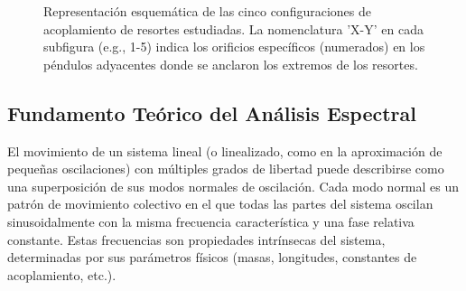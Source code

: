 \begin{figure}[htbp!]
  \hspace{0.1\textwidth}
  \caption{Representaci\'on esquem\'atica de las cinco configuraciones de
    acoplamiento de resortes estudiadas. La nomenclatura 'X-Y' en
    cada subfigura (e.g., 1-5) indica los orificios espec\'ificos
    (numerados) en los p\'endulos adyacentes donde se anclaron
  los extremos de los resortes.}
  \label{fig:configs}
\end{figure}

\subsection*{Fundamento Te\'orico del An\'alisis Espectral}

El movimiento de un sistema lineal (o linealizado, como en la
aproximaci\'on de peque\~nas oscilaciones) con m\'ultiples grados de
libertad puede describirse como una superposici\'on de sus
modos normales de oscilaci\'on. Cada modo normal es un patr\'on de
movimiento colectivo en el que todas las partes del sistema oscilan
sinusoidalmente con la misma frecuencia caracter\'istica y una fase
relativa constante. Estas frecuencias son propiedades intr\'insecas
del sistema, determinadas por sus par\'ametros f\'isicos (masas,
longitudes, constantes de acoplamiento, etc.).

